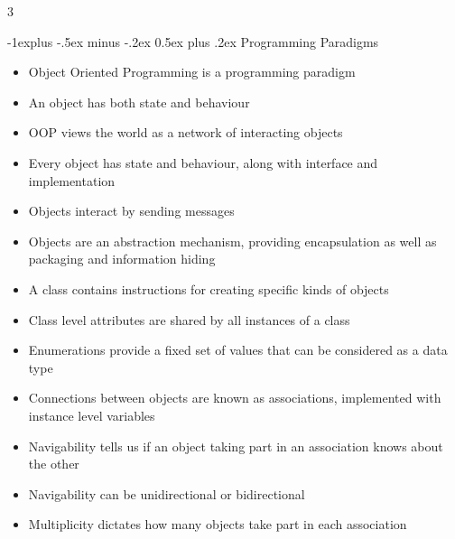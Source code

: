 \documentclass[10pt, landscape]{article}
\makeatletter
\renewcommand{\section}{\@startsection{section}{1}{0mm}%
                                {-1ex plus -.5ex minus -.2ex}%
                                {0.5ex plus .2ex}%
                                {\normalfont\large\bfseries}}
\renewcommand{\section}{\@startsection{section}{2}{0mm}%
                                {-1explus -.5ex minus -.2ex}%
                                {0.5ex plus .2ex}%
                                {\normalfont\normalsize\bfseries}}
\makeatother
\begin{document}
\raggedright
\footnotesize
\begin{multicols*}{3}

\setlength{\columnseprule}{0.25pt}
\setlength{\premulticols}{1pt}
\setlength{\postmulticols}{1pt}
\setlength{\multicolsep}{1pt}
\setlength{\columnsep}{2pt}

\begin{center}
\end{center}

\section{Programming Paradigms}
\begin{itemize}
    \item Object Oriented Programming is a programming paradigm
    \item An object has both state and behaviour
    \item OOP views the world as a network of interacting objects
    \item Every object has state and behaviour, along with interface and implementation
    \item Objects interact by sending messages
    \item Objects are an abstraction mechanism, providing encapsulation as well as packaging and information hiding
    \item A class contains instructions for creating specific kinds of objects
    \item Class level attributes are shared by all instances of a class
    \item Enumerations provide a fixed set of values that can be considered as a data type
    \item Connections between objects are known as associations, implemented with instance level variables
    \item Navigability tells us if an object taking part in an association knows about the other
    \item Navigability can be unidirectional or bidirectional
    \item Multiplicity dictates how many objects take part in each association

\end{itemize}
\end{multicols*}
\end{document}
